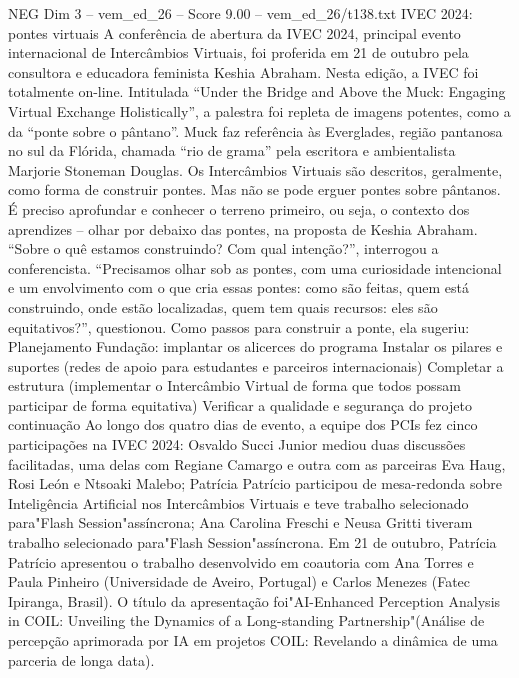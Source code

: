 \begin{textsample}{NEG Dim 3 – vem\_ed\_26 – Score 9.00 – vem\_ed\_26/t138.txt}  \label{ex:f3_neg_159}
IVEC 2024: pontes virtuais A conferência de abertura da IVEC 2024, principal evento internacional de Intercâmbios Virtuais, foi proferida em 21 de outubro pela consultora e educadora feminista Keshia Abraham.
Nesta edição, a IVEC foi totalmente on-line.
Intitulada “Under the Bridge and Above the Muck: Engaging Virtual Exchange Holistically”, a palestra foi repleta de imagens potentes, como a da “ponte sobre o pântano”.
Muck faz referência às Everglades, região pantanosa no sul da Flórida, chamada “rio de grama” pela escritora e ambientalista Marjorie Stoneman Douglas.
Os Intercâmbios Virtuais são descritos, geralmente, como forma de construir pontes.
Mas não se pode erguer pontes sobre pântanos.
É preciso aprofundar e conhecer o terreno primeiro, ou seja, o contexto dos aprendizes – olhar por debaixo das pontes, na proposta de Keshia Abraham. “Sobre o quê estamos construindo?
Com qual intenção?”, interrogou a conferencista. “Precisamos olhar sob as pontes, com uma curiosidade intencional e um envolvimento com o que cria essas pontes: como são feitas, quem está construindo, onde estão localizadas, quem tem quais recursos: eles são equitativos?”, questionou.
Como passos para construir a ponte, ela sugeriu: Planejamento Fundação: implantar os alicerces do programa Instalar os pilares e suportes (redes de apoio para estudantes e parceiros internacionais) Completar a estrutura (implementar o Intercâmbio Virtual de forma que todos possam participar de forma equitativa) Verificar a qualidade e segurança do projeto continuação Ao longo dos quatro dias de evento, a equipe dos PCIs fez cinco participações na IVEC 2024: Osvaldo Succi Junior mediou duas discussões facilitadas, uma delas com Regiane Camargo e outra com as parceiras Eva Haug, Rosi León e Ntsoaki Malebo; Patrícia Patrício participou de mesa-redonda sobre Inteligência Artificial nos Intercâmbios Virtuais e teve trabalho selecionado para"Flash Session"assíncrona; Ana Carolina Freschi e Neusa Gritti tiveram trabalho selecionado para"Flash Session"assíncrona.
Em 21 de outubro, Patrícia Patrício apresentou o trabalho desenvolvido em coautoria com Ana Torres e Paula Pinheiro (Universidade de Aveiro, Portugal) e Carlos Menezes (Fatec Ipiranga, Brasil).
O título da apresentação foi"AI-Enhanced Perception Analysis in COIL: Unveiling the Dynamics of a Long-standing Partnership"(Análise de percepção aprimorada por IA em projetos COIL: Revelando a dinâmica de uma parceria de longa data).

\end{textsample}
